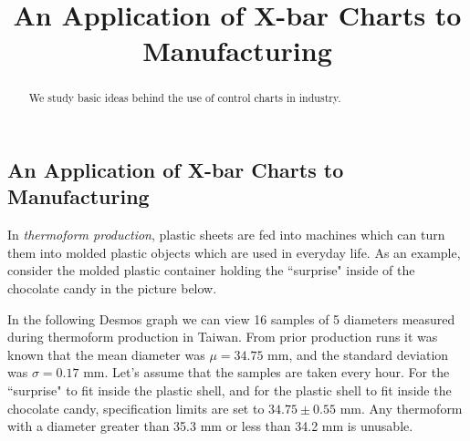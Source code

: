 \documentclass{ximera}
\author{}
\title{An Application of X-bar Charts to Manufacturing} \license{CC BY-NC-SA 4.0}
\begin{document}
\begin{abstract}
We study basic ideas behind the use of control charts in industry.
\end{abstract}
\maketitle

\begin{onlineOnly}
\section*{An Application of X-bar Charts to Manufacturing}
\end{onlineOnly}

In \emph{thermoform production}, plastic sheets are fed into machines which can turn them into molded plastic objects which are used in everyday life.  As an example, consider the molded plastic container holding the ``surprise" inside of the chocolate candy in the picture below.

\begin{center}
      \end{center}

In the following Desmos graph we can view 16 samples of 5 diameters measured during thermoform production in Taiwan.  From prior production runs it was known that the mean diameter was $\mu = 34.75$ mm, and the standard deviation was $\sigma = 0.17$ mm.  Let's assume that the samples are taken every hour.  For the ``surprise" to fit inside the plastic shell, and for the plastic shell to fit inside the chocolate candy, specification limits are set to $34.75\pm 0.55$ mm.  Any thermoform with a diameter greater than 35.3 mm or less than 34.2 mm is unusable.
 
\end{document}
